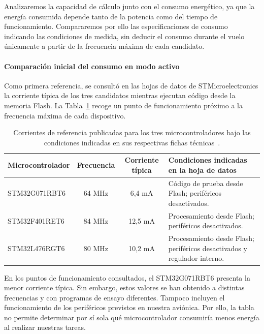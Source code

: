 \documentclass[11pt,a4paper]{article}
\begin{document}
Analizaremos la capacidad de cálculo junto con el consumo
energético, ya que la energía consumida depende
tanto de la potencia como del tiempo de funcionamiento. Compararemos por ello las
especificaciones de consumo indicando las condiciones de medida,
sin deducir el consumo durante el vuelo únicamente a partir de
la frecuencia máxima de cada candidato.
\paragraph{Comparación inicial del consumo en modo activo}

Como primera referencia, se consultó en las hojas de datos de
STMicroelectronics la corriente típica de los tres candidatos
mientras ejecutan código desde la memoria Flash. La
Tabla~\ref{tab:consumo_run_candidatos} recoge un punto de
funcionamiento próximo a la frecuencia máxima de cada dispositivo.

\begin{table}[H]
    \centering
    \renewcommand{\arraystretch}{1.25}
    \begin{tabular}{p{3.6cm}ccp{6.2cm}}
        \toprule
        Microcontrolador
        & Frecuencia
        & Corriente típica
        & Condiciones indicadas en la hoja de datos \\
        \midrule
        STM32G071RBT6
        & 64 MHz
        & 6,4 mA
        & Código de prueba desde Flash; periféricos desactivados. \\

        STM32F401RET6
        & 84 MHz
        & 12,5 mA
        & Procesamiento desde Flash; periféricos desactivados. \\

        STM32L476RGT6
        & 80 MHz
        & 10,2 mA
        & Procesamiento desde Flash; periféricos desactivados y
          regulador interno. \\
        \bottomrule
    \end{tabular}
   \caption{Corrientes de referencia publicadas para los tres
microcontroladores bajo las condiciones indicadas en sus respectivas
fichas técnicas~\cite{st_g071,st_f401,st_l476}.}%
    \label{tab:consumo_run_candidatos}
\end{table}

En los puntos de funcionamiento consultados, el STM32G071RBT6
presenta la menor corriente típica. Sin embargo, estos valores
se han obtenido a distintas frecuencias y con programas de
ensayo diferentes. Tampoco incluyen el funcionamiento de los
periféricos previstos en nuestra aviónica. Por ello, la tabla
no permite determinar por sí sola qué microcontrolador
consumiría menos energía al realizar nuestras tareas.
\end{document}
